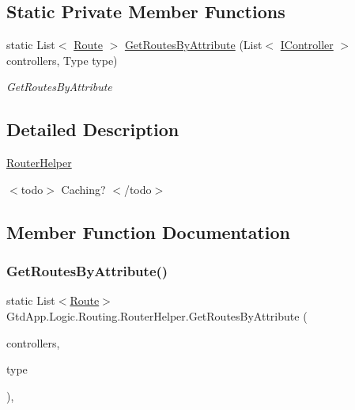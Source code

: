 \subsection*{Static Private Member Functions}
\begin{DoxyCompactItemize}
\item 
static List$<$ \mbox{\hyperlink{class_gtd_app_1_1_logic_1_1_routing_1_1_route}{Route}} $>$ \mbox{\hyperlink{class_gtd_app_1_1_logic_1_1_routing_1_1_router_helper_a12bb73714351ed5bdcbc21e440aafec1}{Get\+Routes\+By\+Attribute}} (List$<$ \mbox{\hyperlink{interface_gtd_app_1_1_logic_1_1_interfaces_1_1_i_controller}{I\+Controller}} $>$ controllers, Type type)
\begin{DoxyCompactList}\small\item\em Get\+Routes\+By\+Attribute \end{DoxyCompactList}\end{DoxyCompactItemize}


\subsection{Detailed Description}
\mbox{\hyperlink{class_gtd_app_1_1_logic_1_1_routing_1_1_router_helper}{Router\+Helper}} 

$<$todo$>$ Caching? $<$/todo$>$ 

\subsection{Member Function Documentation}
\mbox{\label{class_gtd_app_1_1_logic_1_1_routing_1_1_router_helper_a12bb73714351ed5bdcbc21e440aafec1}} 
\subsubsection{\texorpdfstring{Get\+Routes\+By\+Attribute()}{GetRoutesByAttribute()}}
{\footnotesize\ttfamily static List$<$\mbox{\hyperlink{class_gtd_app_1_1_logic_1_1_routing_1_1_route}{Route}}$>$ Gtd\+App.\+Logic.\+Routing.\+Router\+Helper.\+Get\+Routes\+By\+Attribute (\begin{DoxyParamCaption}\item[{List$<$ \mbox{\hyperlink{interface_gtd_app_1_1_logic_1_1_interfaces_1_1_i_controller}{I\+Controller}} $>$}]{controllers,  }\item[{Type}]{type }\end{DoxyParamCaption})\hspace{0.3cm}{\ttfamily [static]}, {\ttfamily [private]}}



